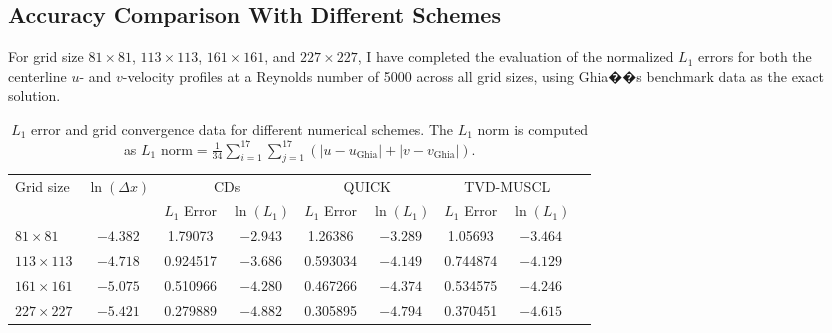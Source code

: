 \documentclass[12pt]{article}
\theoremstyle{plain}  %
\theoremstyle{definition}  %
\begin{document}
\newpage 
\subsection{Accuracy Comparison With Different Schemes}

For grid size $81 \times 81$, $113 \times 113$, $161 \times 161$, and $227 \times 227$,
I have completed the evaluation of the normalized $L_{1}$ errors for both the centerline 
$u$- and 
$v$-velocity profiles at a Reynolds number of 5000 across all grid sizes, using Ghia��s benchmark data as the exact solution.
\begin{table}[H]
\centering
\small
\caption{$L_1$ error and grid convergence data for different numerical schemes. 
The $L_1$ norm is computed as $L_1 \text{ norm} = \frac{1}{34}\sum_{i=1}^{17}\sum_{j=1}^{17}(|u-u_{\text{Ghia}}|+|v-v_{\text{Ghia}}|)$.}
\label{tab:error_comparison}
\begin{tabular*}{\textwidth}{@{\extracolsep{\fill}}lcccccccc@{}}
\toprule
\multirow{2}{*}{Grid size} & \multirow{2}{*}{$\ln(\Delta x)$} & \multicolumn{2}{c}{CDs} & \multicolumn{2}{c}{QUICK} & \multicolumn{2}{c}{TVD-MUSCL} \\
\cmidrule(lr){3-4} \cmidrule(lr){5-6} \cmidrule(lr){7-8}
& & $L_1$ Error & $\ln(L_1)$ & $L_1$ Error & $\ln(L_1)$ & $L_1$ Error & $\ln(L_1)$ \\
\midrule
$81 \times 81$   & $-4.382$ & 1.79073  & $-2.943$ & 1.26386  & $-3.289$ & 1.05693  & $-3.464$ \\
$113 \times 113$ & $-4.718$ & 0.924517 & $-3.686$ & 0.593034 & $-4.149$ & 0.744874 & $-4.129$ \\
$161 \times 161$ & $-5.075$ & 0.510966 & $-4.280$ & 0.467266 & $-4.374$ & 0.534575 & $-4.246$ \\
$227 \times 227$ & $-5.421$ & 0.279889 & $-4.882$ & 0.305895 & $-4.794$ & 0.370451 & $-4.615$ \\
\bottomrule
\end{tabular*}
\end{table}
\end{document}
